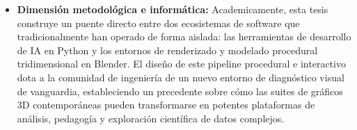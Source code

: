 \begin{itemize}
    \item \textbf{Dimensión metodológica e informática:} Academicamente, esta tesis construye un puente 
    directo entre dos ecosistemas de software que tradicionalmente han operado de forma aislada: las 
    herramientas de desarrollo de IA en Python y los entornos de renderizado y modelado procedural 
    tridimensional en Blender. El diseño de este pipeline procedural e interactivo dota a la comunidad de 
    ingeniería de un nuevo entorno de diagnóstico visual de vanguardia, estableciendo un precedente sobre 
    cómo las suites de gráficos 3D contemporáneas pueden transformarse en potentes plataformas de análisis, 
    pedagogía y exploración científica de datos complejos.
\end{itemize}